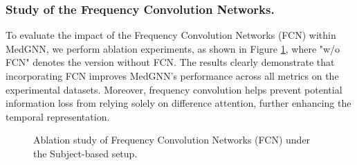 \subsubsection{Study of the Frequency Convolution Networks.} 
To evaluate the impact of the Frequency Convolution Networks (FCN) within MedGNN, we perform ablation experiments, as shown in Figure \ref{fig:abl_FL}, where "w/o FCN" denotes the version without FCN. The results clearly demonstrate that incorporating FCN improves MedGNN’s performance across all metrics on the experimental datasets. Moreover, frequency convolution helps prevent potential information loss from relying solely on difference attention, further enhancing the temporal representation.


\begin{figure}[!t]
    \vspace{-4mm}
    \centering
    \hspace{-4mm}
    \hspace{-4mm}
    \vspace{-4mm}
    \caption{Ablation study of Frequency Convolution Networks (FCN) under the Subject-based setup.}
    \label{fig:abl_FL}
    \vspace{-4mm}
\end{figure}


